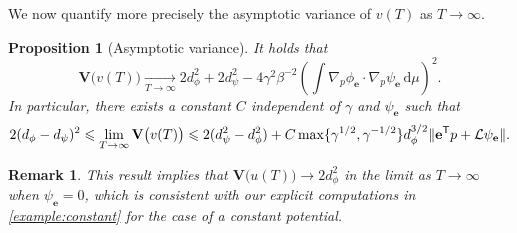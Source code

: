 \documentclass[11pt,a4paper]{article}
\newcommand{\var}[0]{\mathbf{V}}
\newcommand{\grad}{\nabla}
\newcommand{\vect}[1]{\boldsymbol{\mathbf #1}}
\renewcommand{\d}{\mathrm d}
\renewcommand{\t}{\mathsf T}
\theoremstyle{plain}
\newtheorem{proposition}{Proposition}[section]
\newtheorem{remark}{Remark}[section]
\numberwithin{equation}{section}
\renewcommand{\leq}{\leqslant}
\renewcommand{\geq}{\geqslant}
\begin{document}
We now quantify more precisely the asymptotic variance of $v(T)$ as $T \to \infty$.
\begin{proposition}
    [Asymptotic variance]
    \label{proposition:asymptotic_variance}
    It holds that
    \begin{equation}
        \label{eq:asymptotic_variance}
        \var\bigl(v(T)\bigr) \xrightarrow[T \to \infty]{}
        2 d_{\phi}^2 + 2 d_{\psi}^2 - 4 \gamma^2 \beta^{-2} \left( \int \grad_p \phi_{\vect e} \cdot \grad_p \psi_{\vect e} \, \d \mu \right)^2.
    \end{equation}
    In particular, there exists a constant $C$ independent of $\gamma$ and $\psi_{\vect e}$ such that
    \begin{align}
        \label{eq:bounds_asymptotic_variance}
        2(d_{\phi} - d_{\psi})^2
        \leq \lim_{T \to \infty} \var \bigl(v(T)\bigr)
        \leq 2 (d_{\psi}^2 - d_{\phi}^2) + C \max\{\gamma^{1/2}, \gamma^{-1/2}\} d_{\phi}^{3/2} \norm*{\vect e^\t p + \mathcal L \psi_{\vect e}}.
    \end{align}
\end{proposition}
\begin{remark}
    This result implies that $\var\bigl(u(T)\bigr) \to 2 d_{\phi}^2$ in the limit as $T \to \infty$ when $\psi_{\vect e} = 0$,
    which is consistent with our explicit computations in \cref{example:constant} for the case of a constant potential.
\end{remark}
\end{document}
